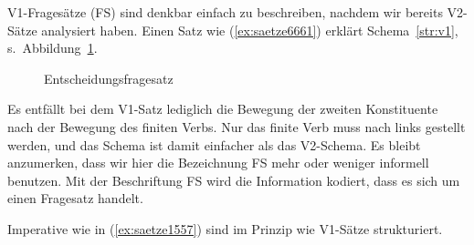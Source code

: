 \label{sec:verberstsatz}



\begin{sloppypar}
V1-Fragesätze (FS) sind denkbar einfach zu beschreiben, nachdem wir bereits V2-Sätze analysiert haben.
Einen Satz wie (\ref{ex:saetze6661}) erklärt Schema~\ref{str:v1}, s.\ Abbildung~\ref{fig:v1satz}.
\end{sloppypar}

\begin{exe}
\end{exe}

\begin{figure}
  \centering
  \vspace{0.3cm}
  \caption{Entscheidungsfragesatz}
  \label{fig:v1satz}
\end{figure}

Es entfällt bei dem V1-Satz lediglich die Bewegung der zweiten Konstituente nach der Bewegung des finiten Verbs.
Nur das finite Verb muss nach links gestellt werden, und das Schema ist damit einfacher als das V2-Schema.
Es bleibt anzumerken, dass wir hier die Bezeichnung FS mehr oder weniger informell benutzen.
Mit der Beschriftung FS wird die Information kodiert, dass es sich um einen Fragesatz handelt.

Imperative wie in (\ref{ex:saetze1557}) sind im Prinzip wie V1-Sätze strukturiert.

\begin{exe}
\end{exe}

